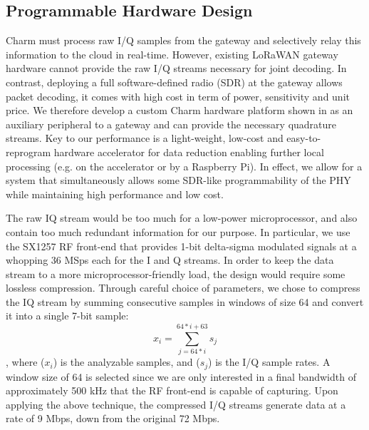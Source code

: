 \subsection{Programmable Hardware Design}
\label{sec:hardware}

Charm must process raw I/Q samples from the gateway and selectively relay this
information to the cloud in real-time. However, existing LoRaWAN gateway
hardware cannot provide the raw I/Q streams necessary for joint decoding. In
contrast, deploying a full software-defined radio (SDR) at the gateway allows
packet decoding, it comes with high cost in term of power, sensitivity and
unit price. We therefore develop a custom Charm hardware platform shown in
 as an auxiliary peripheral to a gateway and can
provide the necessary quadrature streams. Key to our performance is a
light-weight, low-cost and easy-to-reprogram hardware accelerator for data
reduction enabling further local processing (e.g. on the accelerator or by a
Raspberry Pi). In effect, we allow for a system that simultaneously allows
some SDR-like programmability of the PHY while maintaining high performance
and low cost.

 The raw IQ stream would be too
much for a low-power microprocessor, and  also contain too much redundant
information for our purpose. In particular, we use the SX1257 RF front-end
that provides 1-bit delta-sigma modulated signals at a whopping 36 MSps each
for the I and Q streams.  In order to keep the data stream to a more
microprocessor-friendly load, the design would require some lossless
compression. Through careful choice of parameters, we chose to compress the IQ
stream by summing consecutive samples in windows of size 64 and convert it
into a single 7-bit sample:
\begin{equation}
x_i = \sum_{j=64*i}^{64*i + 63} s_j
\end{equation}
, where ($x_i$) is the analyzable samples, and ($s_j$) is the I/Q sample
rates. A window size of 64 is selected since we are only interested in a final
bandwidth of approximately 500 kHz that the RF front-end is capable of
capturing. Upon applying the above technique, the compressed I/Q streams
generate data at a rate of 9 Mbps, down from the original 72 Mbps.

